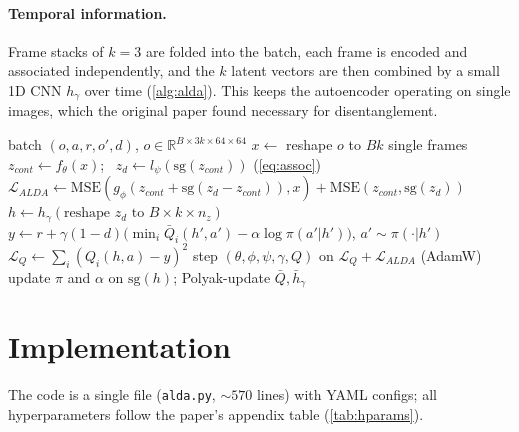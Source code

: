 \documentclass{article}
\theoremstyle{plain}
\theoremstyle{definition}
\theoremstyle{remark}
\begin{document}
\paragraph{Temporal information.} Frame stacks of $k{=}3$ are folded into the
batch, each frame is encoded and associated independently, and the $k$ latent
vectors are then combined by a small 1D CNN $h_\gamma$ over time
(\cref{alg:alda}). This keeps the autoencoder operating on single images,
which the original paper found necessary for disentanglement.

\begin{algorithm}[tb]
   \caption{SAC+ALDA update (one gradient step)}
   \label{alg:alda}
\begin{algorithmic}
    batch $(o, a, r, o', d)$, $o\in\mathbb{R}^{B\times 3k\times64\times64}$
   \STATE $x \leftarrow$ reshape $o$ to $Bk$ single frames
   \STATE $z_{cont} \leftarrow f_\theta(x)$; \ $z_d \leftarrow l_\psi(\mathrm{sg}(z_{cont}))$ \hfill (\cref{eq:assoc})
   \STATE $\mathcal{L}_{ALDA} \leftarrow \mathrm{MSE}(g_\phi(z_{cont}{+}\mathrm{sg}(z_d{-}z_{cont})), x) + \mathrm{MSE}(z_{cont}, \mathrm{sg}(z_d))$
   \STATE $h \leftarrow h_\gamma(\text{reshape } z_d \text{ to } B\times k\times n_z)$
   \STATE $y \leftarrow r + \gamma(1{-}d)\big(\min_i \bar Q_i(h', a') - \alpha\log\pi(a'|h')\big)$, $a'\sim\pi(\cdot|h')$
   \STATE $\mathcal{L}_Q \leftarrow \sum_i (Q_i(h,a) - y)^2$
   \STATE step $(\theta,\phi,\psi,\gamma,Q)$ on $\mathcal{L}_Q + \mathcal{L}_{ALDA}$ (AdamW)
   \STATE update $\pi$ and $\alpha$ on $\mathrm{sg}(h)$; Polyak-update $\bar Q, \bar h_\gamma$
   \ENDIF
\end{algorithmic}
\end{algorithm}

\section{Implementation}
\label{sec:impl}

The code is a single file (\texttt{alda.py}, ${\sim}570$ lines) with YAML
configs; all hyperparameters follow the paper's appendix table
(\cref{tab:hparams}).
\end{document}
